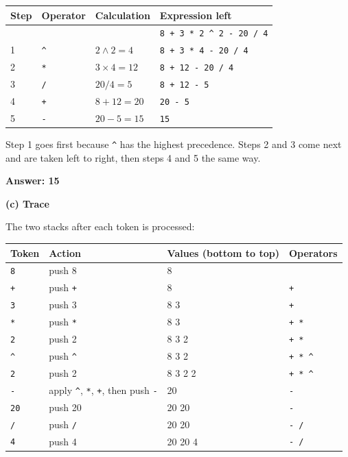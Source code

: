 \documentclass[11pt]{article}
\begin{document}
\begin{tabular}{llll}
Step & Operator & Calculation & Expression left \\[2pt]
\hline
    &            &                 & \texttt{8 + 3 * 2 \^{} 2 - 20 / 4} \\
1 & \texttt{\^{}} & $2 \wedge 2 = 4$   & \texttt{8 + 3 * 4 - 20 / 4} \\
2 & \texttt{*}    & $3 \times 4 = 12$  & \texttt{8 + 12 - 20 / 4} \\
3 & \texttt{/}    & $20 / 4 = 5$       & \texttt{8 + 12 - 5} \\
4 & \texttt{+}    & $8 + 12 = 20$      & \texttt{20 - 5} \\
5 & \texttt{-}    & $20 - 5 = 15$      & \texttt{15} \\
\end{tabular}

Step 1 goes first because \texttt{\^{}} has the highest precedence. Steps 2 and 3 come next
and are taken left to right, then steps 4 and 5 the same way.

\textbf{Answer: 15}

\textbf{(c) Trace}

The two stacks after each token is processed:

\begin{tabular}{llll}
Token & Action & Values (bottom to top) & Operators \\[2pt]
\hline
\texttt{8}  & push 8 & 8 & \\
\texttt{+}  & push \texttt{+} & 8 & \texttt{+} \\
\texttt{3}  & push 3 & 8 3 & \texttt{+} \\
\texttt{*}  & push \texttt{*} & 8 3 & \texttt{+ *} \\
\texttt{2}  & push 2 & 8 3 2 & \texttt{+ *} \\
\texttt{\^{}}  & push \texttt{\^{}} & 8 3 2 & \texttt{+ * \^{}} \\
\texttt{2}  & push 2 & 8 3 2 2 & \texttt{+ * \^{}} \\
\texttt{-}  & apply \texttt{\^{}}, \texttt{*}, \texttt{+}, then push \texttt{-} & 20 & \texttt{-} \\
\texttt{20} & push 20 & 20 20 & \texttt{-} \\
\texttt{/}  & push \texttt{/} & 20 20 & \texttt{- /} \\
\texttt{4}  & push 4 & 20 20 4 & \texttt{- /} \\
\end{tabular}
\end{document}

